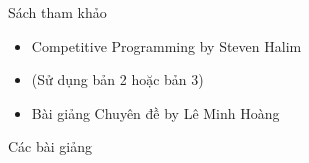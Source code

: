 \documentclass{beamer}
\newcommand{\bi}{\begin{itemize}}
\newcommand{\ei}{\end{itemize}}
\begin{document}
\begin{frame}{Sách tham khảo}
    \vspace{20pt}

    \bi
        \item {\color{hilight}Competitive Programming} by Steven Halim
        \item[] (Sử dụng bản 2 hoặc bản 3)
        \vspace{10pt}
        \item {\color{hilight}Bài giảng Chuyên đề} by Lê Minh Hoàng
    \ei
\end{frame}

\begin{frame}{Các bài giảng}
 
\end{frame}
\end{document}

